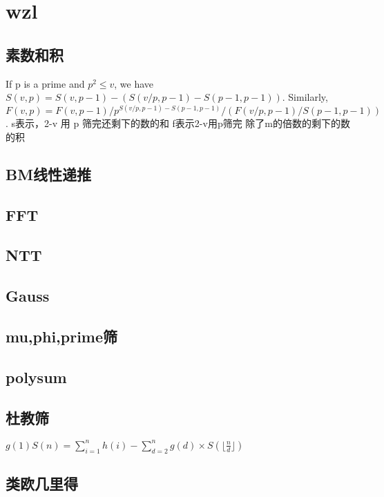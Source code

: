 \newpage
\section{wzl}
	\subsection{素数和积}
		\begin{flushleft}
			If p is a prime and $p^2 \leq v$, we have $S(v,p) = S(v,p-1) - (S(v/p,p-1) - S(p-1,p-1))$.
			\linebreak Similarly, $F(v,p) = F(v,p-1) / p^{S(v/p,p-1)-S(p-1,p-1)} / (F(v/p,p-1) / S(p-1,p-1))$.
			\linebreak s表示，2-v 用 p 筛完还剩下的数的和
			\linebreak f表示2-v用p筛完 除了m的倍数的剩下的数的积
		\end{flushleft}
		
	\subsection{BM线性递推}
		
	\subsection{FFT}
		
	\subsection{NTT}
		
	\subsection{Gauss}
		
	\subsection{mu,phi,prime筛}
		
	\subsection{polysum}
		
	\subsection{杜教筛}
		\begin{flushleft}
			$g(1)S(n) = \sum_{i = 1}^{n}h(i) - \sum_{d = 2}^{n}g(d) \times S(\lfloor\frac{n}{d}\rfloor) $
		\end{flushleft}
		
	\subsection{类欧几里得}
		

